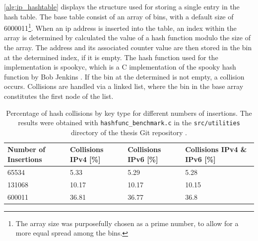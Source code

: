 \ref{alg:ip_hashtable} displays the structure used for storing a single entry in the hash table. The base
table consist of an array of bins, with a default size of 6000011\footnote{The array size was purposefully chosen as a prime number, to allow for a more equal spread among the bins.}.
When an ip address is inserted into the table, an index within the array is determined by calculated the value of a hash function modulo 
the size of the array. The address and its associated counter value are then stored in the bin at the determined index, if it is empty. 
The hash function used for the implementation is spookyc, which is a C implementation of
the spooky hash function by Bob Jenkins \cite{spookyc}. If the bin at the determined is not empty, a collision occurs.
Collisions are handled via a linked list, where the bin in the base array constitutes the first node of the list.
\begin{table}[h!]
    \label{tab:hash_col}
    \centering
    \small
    \begin{tabular}{llll}
        \toprule
        \textbf{Number of Insertions} & \textbf{Collisions IPv4 [\%]} & \textbf{Collisions IPv6 [\%]} & \textbf{Collisions IPv4 \& IPv6 [\%]}\\ \midrule 
        65534 & 5.33 & 5.29 & 5.28 \\ \midrule
        131068 & 10.17 & 10.17 & 10.15 \\ \midrule
        600011 & 36.81 & 36.77 & 36.8 \\
        \bottomrule
    \end{tabular}
    \caption[Hash Collisions]{Percentage of hash collisions by key type for different numbers of insertions. The results were obtained
    with \texttt{hashfunc\_benchmark.c} in the \texttt{src/utilities} directory of the thesis Git repository \cite{gitlab}.}
\end{table}

